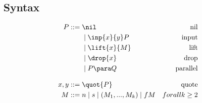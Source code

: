 \subsection{Syntax}
\begin{align*}
P  ::= \; &  \nil & \text{nil} \\
  & \mid \inp{x}{y}P & \text{input} \\
  & \mid \lift{x}{M} & \text{lift} \\
  & \mid \drop{x} & \text{drop} \\
  & \mid P \para Q & \text{parallel} \\[3mm]
x,y ::= \; & \quot{P} & \text{quote}\\
M::=\; & n \mid s \mid (M_1,...,M_k) \mid fM &for all k \geq 2
\end{align*}